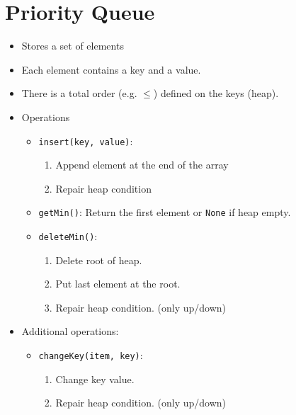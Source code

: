 \documentclass[12pt, a4paper]{scrartcl}
\begin{document}
\section{Priority Queue}
\label{sec:priority_queue}
\begin{itemize}
\item Stores a set of elements
\item Each element contains a key and a value.
\item There is a total order (e.g. $\le$) defined on the keys (heap).
\item Operations
  \begin{itemize}
  \item \texttt{insert(key, value)}:
    \begin{enumerate}
    \item Append element at the end of the array
    \item Repair heap condition
    \end{enumerate}
  \item \texttt{getMin()}: Return the first element or \texttt{None} if heap empty.
  \item \texttt{deleteMin()}:
    \begin{enumerate}
    \item Delete root of heap.
    \item Put last element at the root.
    \item Repair heap condition. (only up/down)
    \end{enumerate}
  \end{itemize}
\item Additional operations:
  \begin{itemize}
  \item \texttt{changeKey(item, key)}:
    \begin{enumerate}
    \item Change key value.
    \item Repair heap condition. (only up/down)
    \end{enumerate}


\end{itemize}
\end{itemize}
\end{document}
